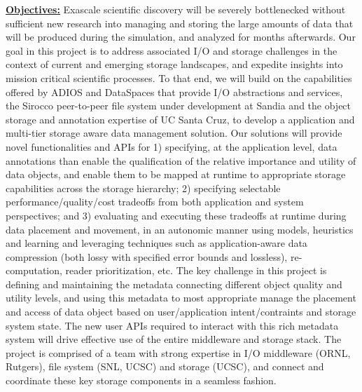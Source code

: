 \documentclass[11pt,letterpaper]{article}
\begin{document}
\underline{\textbf{Objectives:}}
Exascale scientific discovery will be severely bottlenecked without sufficient
new research into managing and storing the large amounts of data that will be
produced during the simulation, and analyzed for months afterwards.  Our goal
in this project is to address associated I/O and storage challenges in the context 
of current and emerging storage landscapes, and expedite insights into mission 
critical scientific processes. To that end, we will build on the capabilities offered
by ADIOS and DataSpaces that provide I/O abstractions and services, the Sirocco 
peer-to-peer file system under development at Sandia and the object storage 
and annotation expertise of UC Santa Cruz, to develop a application and 
multi-tier storage aware data management solution. Our solutions will provide
novel functionalities and APIs for 
1) specifying, at the application level, data annotations than enable the qualification
 of the relative importance and utility of data objects, and enable them to be 
 mapped at runtime to appropriate storage capabilities across the storage hierarchy;
2) specifying selectable performance/quality/cost tradeoffs from both application and system perspectives; and
3) evaluating and executing these tradeoffs at runtime during data placement and movement, 
in an autonomic manner using models, heuristics and learning and leveraging  
techniques such as application-aware data compression (both lossy with specified error bounds 
and lossless), re-computation,  reader prioritization, etc.
The key challenge in this project is defining and maintaining the metadata
 connecting different object quality and utility levels, and using this metadata 
 to most appropriate manage the placement and access of data object based on 
 user/application intent/contraints and storage system state.
The new user APIs required to interact with this rich metadata system will drive effective
use of the entire middleware and storage stack. 
The project is comprised of a team with strong expertise in I/O middleware (ORNL, Rutgers), file system (SNL,
UCSC) and storage (UCSC), and connect and coordinate these key storage
components in a seamless fashion.
\end{document}
